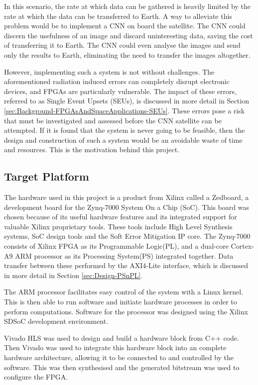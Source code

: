 \documentclass[12pt]{article}
\begin{document}
In this scenario, the rate at which data can be gathered is heavily limited by the rate at which the data can be transferred to Earth. A way to alleviate this problem would be to implement a CNN on board the satellite. The CNN could discern the usefulness of an image and discard uninteresting data, saving the cost of transferring it to Earth. The CNN could even analyse the images and send only the results to Earth, eliminating the need to transfer the images altogether. 

However, implementing such a system is not without challenges. The aforementioned radiation induced errors can completely disrupt electronic devices, and FPGAs are particularly vulnerable. The impact of these errors, referred to as Single Event Upsets (SEUs), is discussed in more detail in Section \ref{sec:Background-FPGAsAndSpaceApplications-SEUs}. These errors pose a risk that must be investigated and assessed before the CNN satellite can be attempted. If it is found that the system is never going to be feasible, then the design and construction of such a system would be an avoidable waste of time and resources. This is the motivation behind this project.

\subsection{Target Platform}
\label{sec:Intro-TargetPlatform}


The hardware used in this project is a product from Xilinx called a Zedboard, a development board for the Zynq-7000 System On a Chip (SoC). This board was chosen because of its useful hardware features and its integrated support for valuable Xilinx proprietary tools. These tools include High Level Synthesis systems, SoC design tools and the Soft Error Mitigation IP core. The Zynq-7000 consists of Xilinx FPGA as its Programmable Logic(PL), and a dual-core Cortex-A9 ARM processor as its Processing System(PS) integrated together. Data transfer between these performed by the AXI4-Lite interface, which is discussed in more detail in Section \ref{sec:Design-PSnPL}.

The ARM processor facilitates easy control of the system with a Linux kernel. This is then able to run software and initiate hardware processes in order to perform computations. Software for the processor was designed using the Xilinx SDSoC development environment.

Vivado HLS was used to design and build a hardware block from C++ code. Then Vivado was used to integrate this hardware block into an complete hardware architecture, allowing it to be connected to and controlled by the software. This was then synthesised and the generated bitstream was used to configure the FPGA.
\end{document}
